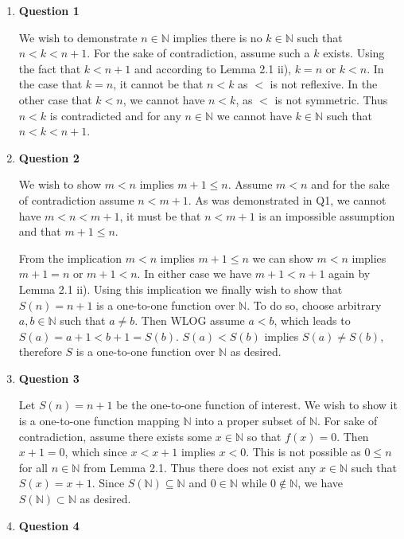 \documentclass{article}
\begin{document}
\begin{enumerate}
	\item \textbf{Question 1}
	\medskip 
	
	We wish to demonstrate $n \in \mathbb{N}$ implies there is no $k \in \mathbb{N}$ such that $n < k < n + 1$. For the sake of contradiction, assume such a $k$ exists. Using the fact that $k < n + 1$ and according to Lemma 2.1 ii), $k = n$ or $k < n$. In the case that $k = n$, it cannot be that $n < k$ as $<$ is not reflexive. In the other case that $k < n$, we cannot have $n < k$, as $<$ is not symmetric. Thus $n < k$ is contradicted and for any $n \in \mathbb{N}$ we cannot have $k \in \mathbb{N}$ such that $n < k < n + 1$.
	
	\item \textbf{Question 2}
	\medskip
	
	We wish to show $m < n$ implies $m + 1 \leq n$. Assume $m < n$ and for the sake of contradiction assume $n < m + 1$. As was demonstrated in Q1, we cannot have $m < n < m + 1$, it must be that $n < m + 1$ is an impossible assumption and that $m + 1 \leq n$. 
	
	\medskip
	From the implication $m < n$ implies $m + 1 \leq n$ we can show $m < n$ implies $m + 1 = n$ or $m + 1 < n$. In either case we have $m + 1 < n + 1$ again by Lemma 2.1 ii). Using this implication we finally wish to show that $S(n) = n + 1$ is a one-to-one function over $\mathbb{N}$. To do so, choose arbitrary $a,b \in \mathbb{N}$ such that $a \neq b$. Then WLOG assume $a < b$, which leads to $S(a) = a + 1 < b + 1 = S(b)$. $S(a) < S(b)$ implies $S(a) \neq S(b)$, therefore $S$ is a one-to-one function over $\mathbb{N}$ as desired.
	
	\item \textbf{Question 3}
	\medskip
	
	Let $S(n) = n + 1$ be the one-to-one function of interest. We wish to show it is a one-to-one function mapping $\mathbb{N}$ into a proper subset of $\mathbb{N}$.  For sake of contradiction, assume there exists some $x \in \mathbb{N}$ so that $f(x) = 0$. Then $x + 1 = 0$, which since $x < x + 1$ implies $x < 0$. This is not possible as $0 \leq n$ for all $n \in \mathbb{N}$ from Lemma 2.1. Thus there does not exist any $x \in \mathbb{N}$ such that $S(x) = x + 1$. Since $S(\mathbb{N}) \subseteq \mathbb{N}$ and $0 \in \mathbb{N}$ while $0 \notin \mathbb{N}$, we have $S(\mathbb{N}) \subset \mathbb{N}$ as desired.
	
	
	\item \textbf{Question 4}
	\medskip
	

\end{enumerate}
\end{document}
